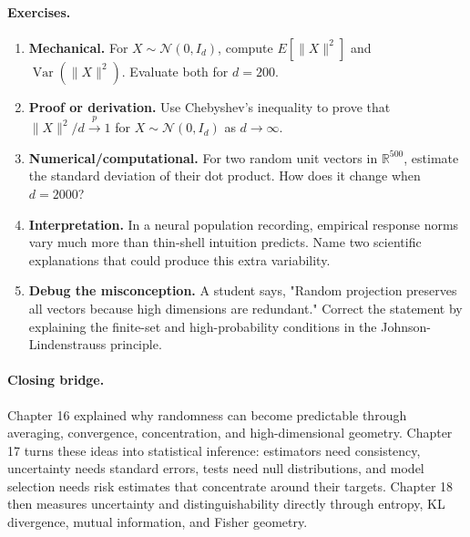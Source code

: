 \paragraph{Exercises.}
\begin{enumerate}[label=\textbf{16.4.\arabic*.}, leftmargin=*]
\item \textbf{Mechanical.} For \(X\sim\mathcal N(0,I_d)\), compute \(E[\|X\|^2]\) and \(\operatorname{Var}(\|X\|^2)\). Evaluate both for \(d=200\).
\item \textbf{Proof or derivation.} Use Chebyshev's inequality to prove that \(\|X\|^2/d\xrightarrow{p}1\) for \(X\sim\mathcal N(0,I_d)\) as \(d\to\infty\).
\item \textbf{Numerical/computational.} For two random unit vectors in \(\mathbb R^{500}\), estimate the standard deviation of their dot product. How does it change when \(d=2000\)?
\item \textbf{Interpretation.} In a neural population recording, empirical response norms vary much more than thin-shell intuition predicts. Name two scientific explanations that could produce this extra variability.
\item \textbf{Debug the misconception.} A student says, "Random projection preserves all vectors because high dimensions are redundant." Correct the statement by explaining the finite-set and high-probability conditions in the Johnson-Lindenstrauss principle.
\end{enumerate}

\paragraph{Closing bridge.}
Chapter 16 explained why randomness can become predictable through averaging, convergence, concentration, and high-dimensional geometry. Chapter 17 turns these ideas into statistical inference: estimators need consistency, uncertainty needs standard errors, tests need null distributions, and model selection needs risk estimates that concentrate around their targets. Chapter 18 then measures uncertainty and distinguishability directly through entropy, KL divergence, mutual information, and Fisher geometry.

\clearpage
